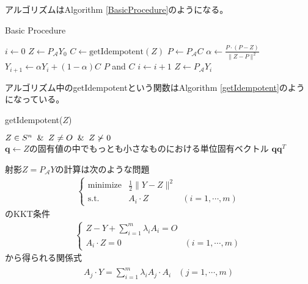 アルゴリズムはAlgorithm \ref{BasicProcedure}のようになる。
\begin{algorithm}
  \caption{Basic Procedure}
  \label{BasicProcedure}
  \begin{algorithmic}[1]
    \State $i \leftarrow 0$
    \State $Z \leftarrow P_\mathcal{A} Y_0$
      \State $C \leftarrow \text{getIdempotent}(Z)$
      \State $P \leftarrow P_\mathcal{A} C$
        \State $\alpha \leftarrow \displaystyle{\frac{P \cdot (P - Z)}{\|Z - P\|^2}}$
        \State $Y_{i + 1} \leftarrow \alpha Y_i + (1 - \alpha) C$
      \Else
        \State \Return $P$ and $C$
      \EndIf
      \State $i \leftarrow i + 1$
      \State $Z \leftarrow P_\mathcal{A} Y_i$
    \EndWhile
  \end{algorithmic}
\end{algorithm}
アルゴリズム中のgetIdempotentという関数はAlgorithm \ref{getIdempotent}のようになっている。
\begin{algorithm}
  \caption{getIdempotent($Z$)}
  \label{getIdempotent}
  \begin{algorithmic}
    \Input $Z \in S^n \And Z \not= O \And Z \not\succ 0$
    \State $\mathbf{q} \leftarrow Z\text{の固有値の中でもっとも小さなものにおける単位固有ベクトル}$
    \State \Return $\mathbf{q} \mathbf{q}^T$
  \end{algorithmic}
\end{algorithm}
射影$Z = P_\mathcal{A} Y$の計算は次のような問題
\begin{align*}
  \left\{
    \begin{array}{lll}
      \text{minimize} & \frac{1}{2} \|Y - Z\|^2 & \\
      \text{s.t.}     & A_i \cdot Z             & (i = 1, \cdots, m)
    \end{array}
  \right.
\end{align*}
のKKT条件
\begin{align*}
  \left\{
    \begin{array}{ll}
      Z - Y + \displaystyle{\sum_{i = 1}^m} \lambda_i A_i = O & \\
      A_i \cdot Z = 0                                         & (i = 1, \cdots, m)
    \end{array}
  \right.
\end{align*}
から得られる関係式
\begin{align*}
  \begin{array}{ll}
    A_j \cdot Y = \displaystyle{\sum_{i = 1}^m} \lambda_i A_j \cdot A_i & (j = 1, \cdots, m)
  \end{array}
\end{align*}
